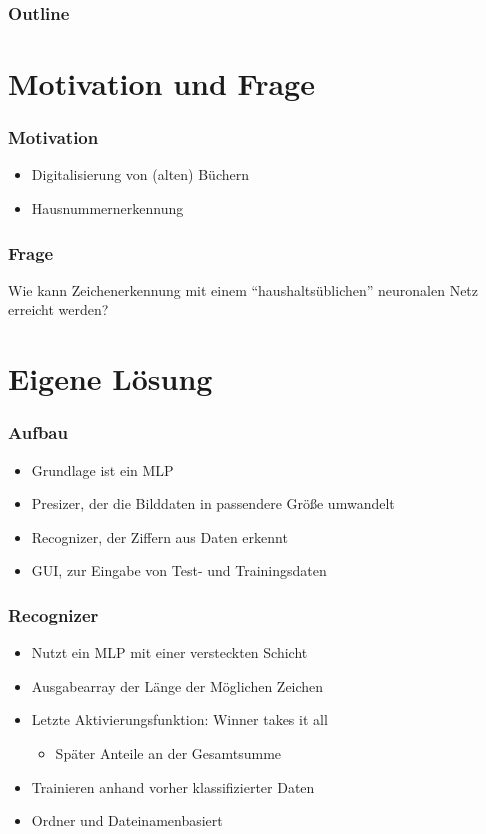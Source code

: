\documentclass[14pt]{beamer}
\institute{Universit\"at Hamburg\\\trinstitute}
\title{\trtitle}
\subtitle{\trtype}
\author{\trauthor}
\date{}
\theoremstyle{remark}
\begin{document}
\renewcommand{\arraystretch}{1.2}

\begin{frame}[plain] %
  \titlepage
\end{frame}

\begin{frame}
	\frametitle{Outline}
	\tableofcontents
\end{frame}


\section{Motivation und Frage}
\begin{frame}
	\frametitle{Motivation}
	\begin{itemize}
		\item Digitalisierung von (alten) Büchern
		\item Hausnummernerkennung
	\end{itemize}
\end{frame}

\begin{frame}
	\frametitle{Frage}
	\centering
	Wie kann Zeichenerkennung mit einem "`haushaltsüblichen"' neuronalen Netz erreicht werden?
\end{frame}

\section{Eigene Lösung}
\begin{frame}
	\frametitle{Aufbau}
	\begin{itemize}
		\item Grundlage ist ein MLP
		\item Presizer, der die Bilddaten in passendere Größe umwandelt
		\item Recognizer, der Ziffern aus Daten erkennt
		\item GUI, zur Eingabe von Test- und Trainingsdaten
	\end{itemize}
\end{frame}

\begin{frame}
	\frametitle{Recognizer}
	\begin{itemize}
		\item Nutzt ein MLP mit einer versteckten Schicht
		\item Ausgabearray der Länge der Möglichen Zeichen
		\item Letzte Aktivierungsfunktion: Winner takes it all
		\begin{itemize}
			\item Später Anteile an der Gesamtsumme
		\end{itemize}
		\item Trainieren anhand vorher klassifizierter Daten
		\item Ordner und Dateinamenbasiert 
	\end{itemize}
\end{frame}
\end{document}
